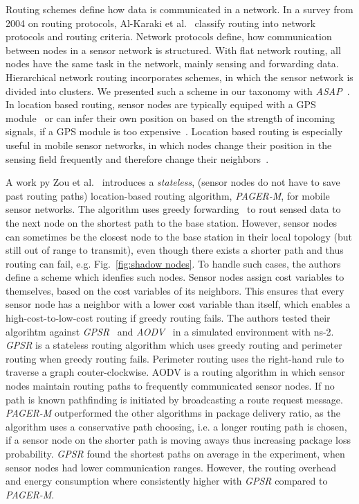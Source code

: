 Routing schemes define how data is communicated in a network. In a survey from
2004 on routing protocols, Al-Karaki et al.~\cite{al2004routing} classify
routing into network protocols and routing criteria. Network protocols define,
how communication between nodes in a sensor network is structured. With flat
network routing, all nodes have the same task in the network, mainly sensing
and forwarding data. Hierarchical network routing incorporates schemes, in
which the sensor network is divided into clusters. We presented such a scheme
in our taxonomy with \textit{ASAP}~\cite{gedik2007asap}. In location based
routing, sensor nodes are typically equiped with a GPS
module~\cite{xu2001geography} or can infer their own position on based on the
strength of incoming signals, if a GPS module is too
expensive~\cite{hu2004localization}. Location based routing is especially
useful in mobile sensor networks, in which nodes change their position in the
sensing field frequently and therefore change their
neighbors~\cite{hu2004localization}.

A work py Zou et al.~\cite{zou2004pager} introduces a \textit{stateless},
(sensor nodes do not have to save past routing paths) location-based routing
algorithm, \textit{PAGER-M}, for mobile sensor networks. The algorithm uses
greedy forwarding~\cite{stojmenovic2001loop} to rout sensed data to the next
node on the shortest path to the base station. However, sensor nodes can
sometimes be the closest node to the base station in their local topology (but
still out of range to transmit), even though there exists a shorter path and
thus routing can fail, e.g. Fig.~\ref{fig:shadow nodes}. To handle such cases,
the authors define a scheme which idenfies such nodes. Sensor nodes assign cost
variables to themselves, based on the cost variables of its neighbors. This
ensures that every sensor node has a neighbor with a lower cost variable than
itself, which enables a high-cost-to-low-cost routing if greedy routing fails.
The authors tested their algorihtm against \textit{GPSR}~\cite{karp2000gpsr}
and \textit{AODV}~\cite{perkins2003ad} in a simulated environment with ns-2.
\textit{GPSR} is a stateless routing algorithm which uses greedy routing and
perimeter routing when greedy routing fails. Perimeter routing uses the
right-hand rule to traverse a graph couter-clockwise. AODV is a routing
algorithm in which sensor nodes maintain routing paths to frequently
communicated sensor nodes. If no path is known pathfinding is initiated by
broadcasting a route request message. \textit{PAGER-M} outperformed the other
algorithms in package delivery ratio, as the algorithm uses a conservative path
choosing, i.e. a longer routing path is chosen, if a sensor node on the shorter
path is moving aways thus increasing package loss probability. \textit{GPSR}
found the shortest paths on average in the experiment, when sensor nodes had
lower communication ranges. However, the routing overhead and energy
consumption where consistently higher with \textit{GPSR} compared to
\textit{PAGER-M}.

